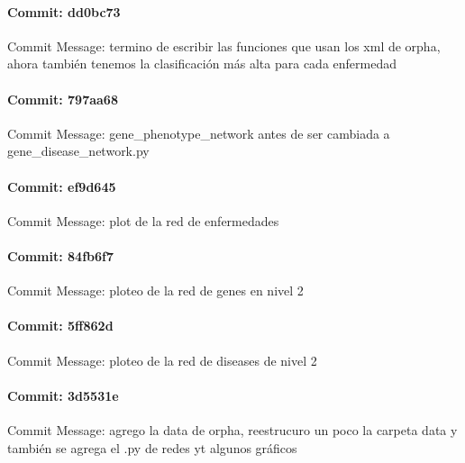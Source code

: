 \documentclass{article}
\begin{document}
\paragraph{Commit: dd0bc73}
Commit Message: termino de escribir las funciones que usan los xml de orpha, ahora también tenemos la clasificación más alta para cada enfermedad

\paragraph{Commit: 797aa68}
Commit Message: gene_phenotype_network antes de ser cambiada a gene_disease_network.py

\paragraph{Commit: ef9d645}
Commit Message: plot de la red de enfermedades

\paragraph{Commit: 84fb6f7}
Commit Message: ploteo de la red de genes en nivel 2

\paragraph{Commit: 5ff862d}
Commit Message: ploteo de la red de diseases de nivel 2

\paragraph{Commit: 3d5531e}
Commit Message: agrego la data de orpha, reestrucuro un poco la carpeta data y también se agrega el .py de redes yt algunos gráficos

\end{document}

